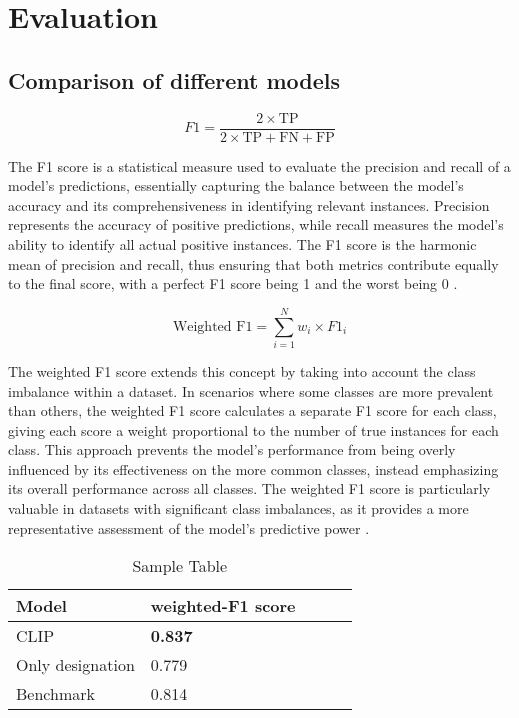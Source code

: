 \chapter{Evaluation}
\label{sec:evaluation}
\section{Comparison of different models} 

\begin{equation}
	F1 = \frac{2 \times \text{TP}}{2 \times \text{TP} + \text{FN} + \text{FP}}
\end{equation}

The F1 score is a statistical measure used to evaluate the precision and recall of a model's predictions, essentially capturing the balance between the model's accuracy and its comprehensiveness in identifying relevant instances. Precision represents the accuracy of positive predictions, while recall measures the model's ability to identify all actual positive instances. The F1 score is the harmonic mean of precision and recall, thus ensuring that both metrics contribute equally to the final score, with a perfect F1 score being 1 and the worst being 0 \cite{chicco-2020}.

\begin{equation}
	\text{Weighted F1} = \sum_{i=1}^{N} w_i \times F1_i
\end{equation}

The weighted F1 score extends this concept by taking into account the class imbalance within a dataset. In scenarios where some classes are more prevalent than others, the weighted F1 score calculates a separate F1 score for each class, giving each score a weight proportional to the number of true instances for each class. This approach prevents the model's performance from being overly influenced by its effectiveness on the more common classes, instead emphasizing its overall performance across all classes. The weighted F1 score is particularly valuable in datasets with significant class imbalances, as it provides a more representative assessment of the model's predictive power \cite{leung-2022}.

\begin{table}[h]
	\centering
	\begin{tabular}{|l|l|l|l|l|}
		\hline
		Model & weighted-F1 score  \\ \hline
		CLIP & \textbf{0.837}  \\ 
		Only designation & 0.779  \\ 
		Benchmark &  0.814  \\  
		\hline
	\end{tabular}
	\caption{Sample Table}
	\label{tab:my_label}
\end{table}

